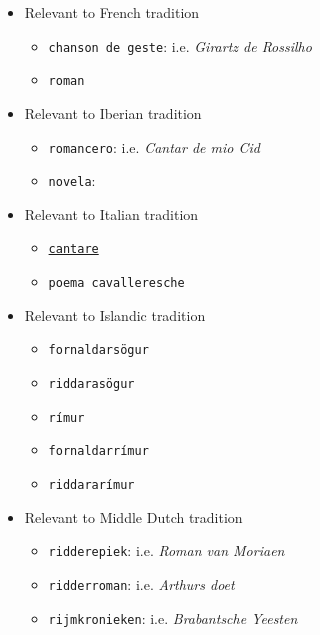 \begin{itemize}
    \begin{multicols}{2}
        \begin{itemize}
            \item Relevant to French tradition
                \begin{itemize}
                    \item \texttt{chanson de geste}: i.e. \textit{Girartz de Rossilho}
                    \item \texttt{roman}
                \end{itemize}
            \item Relevant to Iberian tradition
            \begin{itemize}
                \item \texttt{romancero}: i.e. \textit{Cantar de mio Cid}
                \item \texttt{novela}: 
            \end{itemize}
            \item Relevant to Italian tradition
            \begin{itemize}
                \item \href{https://www.oxfordbibliographies.com/display/document/obo-9780195396584/obo-9780195396584-0199.xml}{\texttt{cantare}}
                \item \texttt{poema cavalleresche}
            \end{itemize}
            \item Relevant to Islandic tradition
                \begin{itemize}
                    \item \texttt{fornaldarsögur}
                    \item \texttt{riddarasögur}
                    \item \texttt{rímur}
                    \item \texttt{fornaldarrímur}
                    \item \texttt{riddararímur}
                \end{itemize}
            \item Relevant to Middle Dutch tradition
                \begin{itemize}
                    \item \texttt{ridderepiek}: i.e. \textit{Roman van Moriaen}
                    \item \texttt{ridderroman}: i.e. \textit{Arthurs doet}
                    \item \texttt{rijmkronieken}: i.e. \textit{Brabantsche Yeesten}

\end{itemize}
\end{itemize}
\end{multicols}
\end{itemize}
